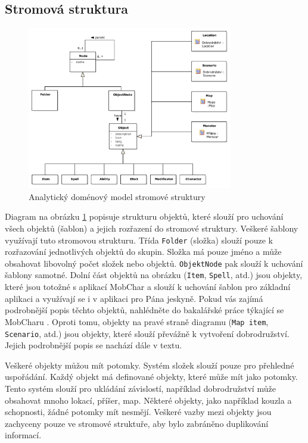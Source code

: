 \documentclass[thesis=B,czech]{resources/FITthesis}[2012/06/26]
\begin{document}
\subsection{Stromová struktura}
\begin{figure}\centering
	\includegraphics[width=0.8\textwidth]{images/domain_struktura}
	\caption[Analytický doménový model stromové struktury]{Analytický doménový model stromové struktury}\label{fig:dm_stromova_struktura}
\end{figure}
Diagram na obrázku \ref{fig:dm_stromova_struktura} popisuje strukturu objektů, které slouží pro uchování všech objektů (šablon) a jejich rozřazení do stromové struktury. Veškeré šablony využívají tuto stromovou strukturu. Třída \texttt{Folder} (složka) slouží pouze k rozřazování jednotlivých objektů do skupin. Složka má pouze jméno a může obsahovat libovolný počet složek nebo objektů. \texttt{ObjektNode} pak slouží k uchování šablony samotné. Dolní část objektů na obrázku (\texttt{Item}, \texttt{Spell}, atd.) jsou objekty, které jsou totožné s aplikací MobChar a slouží k uchování šablon pro základní aplikaci a využívají se i v aplikaci pro Pána jeskyně. Pokud vás zajímá podrobnější popis těchto objektů, nahlédněte do bakalářské práce týkající se MobCharu \cite{Weberova_2017}. Oproti tomu, objekty na pravé straně diagramu (\texttt{Map item}, \texttt{Scenario}, atd.) jsou objekty, které slouží převážně k vytvoření dobrodružství. Jejich podrobnější popis se nachází dále v textu.\par

Veškeré objekty můžou mít potomky. Systém složek slouží pouze pro přehledné uspořádání. Každý objekt má definované objekty, které může mít jako potomky. Tento systém slouží pro ukládání závislostí, například dobrodružství může obsahovat mnoho lokací, příšer, map. Některé objekty, jako například kouzla a schopnosti, žádné potomky mít nesmějí. Veškeré vazby mezi objekty jsou zachyceny pouze ve stromové struktuře, aby bylo zabráněno duplikování informací.
\end{document}
